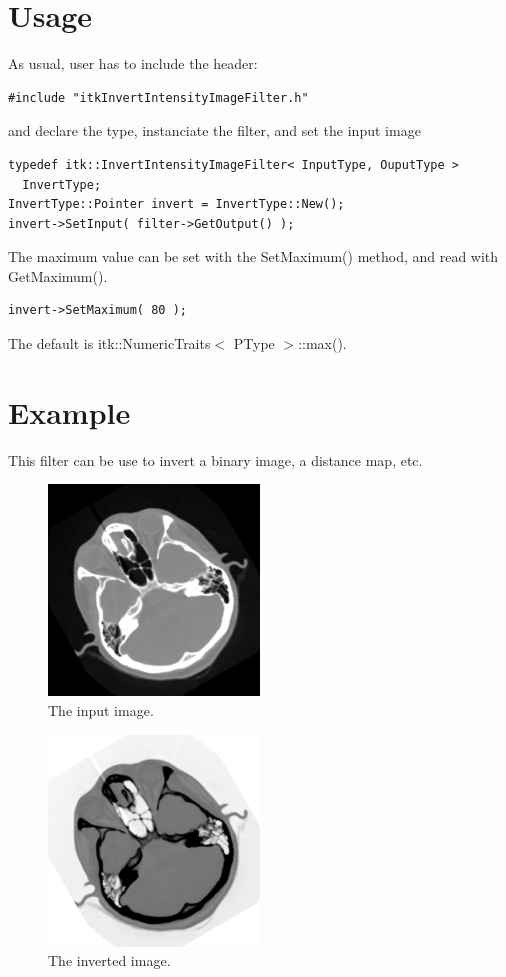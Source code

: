 \documentclass[IJ]{cesj}
\begin{document}
\section{Usage}
As usual, user has to include the header:
\begin{lstlisting}
#include "itkInvertIntensityImageFilter.h"
\end{lstlisting}
and declare the type, instanciate the filter, and set the input image
\begin{lstlisting}
typedef itk::InvertIntensityImageFilter< InputType, OuputType >
  InvertType;
InvertType::Pointer invert = InvertType::New();
invert->SetInput( filter->GetOutput() );
\end{lstlisting}
The maximum value can be set with the SetMaximum() method, and read with GetMaximum().
\begin{lstlisting}
invert->SetMaximum( 80 );
\end{lstlisting}
The default is itk::NumericTraits$<$ PType $>$::max().

\section{Example}
This filter can be use to invert a binary image, a distance map, etc.

\begin{figure}
\centering
\includegraphics[width=0.5\textwidth]{cthead1}
\caption{The input image.}
\end{figure}

\begin{figure}
\centering
\includegraphics[width=0.5\textwidth]{test}
\caption{The inverted image.}
\end{figure}




\end{document}
